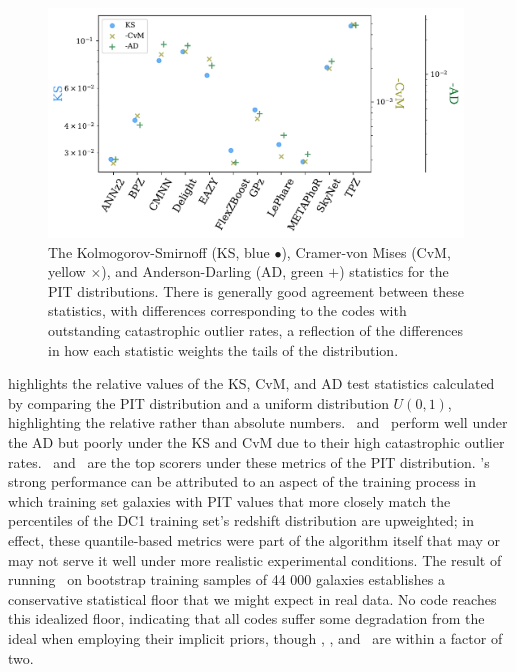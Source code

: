 \begin{figure}
	\centering
	\includegraphics[width=0.98\textwidth]{figures/pzdc1/KSvsCvMvsAD_PIT.pdf}
	\caption[The Kolmogorov-Smirnoff, Cramer-von Mises, and Anderson-Darling statistics for the PIT distributions of each \pzpdf\ estimation code]
		{The Kolmogorov-Smirnoff (KS, blue $\bullet$), Cramer-von Mises (CvM, yellow $\times$), and Anderson-Darling (AD, green $+$) statistics for the PIT distributions.
		There is generally good agreement between these statistics, with differences corresponding to the codes with outstanding catastrophic outlier rates, a reflection of the differences in how each statistic weights the tails of the distribution.
	}
\end{figure}

 highlights the relative values of the KS, CvM, and AD test statistics calculated by comparing the PIT distribution and a uniform distribution $U(0, 1)$, highlighting the relative rather than absolute numbers.
\metaphor\ and \lephare\ perform well under the AD but poorly under the KS and CvM due to their high catastrophic outlier rates.
\annz\ and \flexzboost\  are the top scorers under these metrics of the PIT distribution.
\annz's strong performance can be attributed to an aspect of the training process in which training set galaxies with PIT values that more closely match the percentiles of the DC1 training set's redshift distribution are upweighted; 
in effect, these quantile-based metrics were part of the algorithm itself that may or may not serve it well under more realistic experimental conditions.
The result of running \trainz\ on bootstrap training samples of 44 000 galaxies establishes a conservative statistical floor that we might expect in real data.
No code reaches this idealized floor, indicating that all codes suffer some degradation from the ideal when employing their implicit priors, though \annz, \flexzboost, and \gpz\ are within a factor of two.

